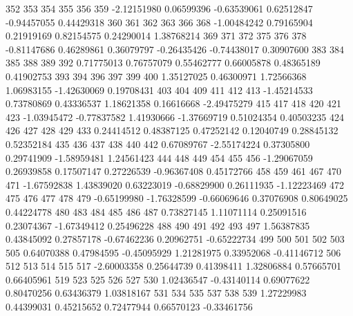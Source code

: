 \documentclass{article}
\begin{document}
\begin{Schunk}
\begin{Soutput}
        352         353         354         355         356         359 
-2.12151980  0.06599396 -0.63539061  0.62512847 -0.94457055  0.44429318 
        360         361         362         363         366         368 
-1.00484242  0.79165904  0.21919169  0.82154575  0.24290014  1.38768214 
        369         371         372         375         376         378 
-0.81147686  0.46289861  0.36079797 -0.26435426 -0.74438017  0.30907600 
        383         384         385         388         389         392 
 0.71775013  0.76757079  0.55462777  0.66005878  0.48365189  0.41902753 
        393         394         396         397         399         400 
 1.35127025  0.46300971  1.72566368  1.06983155 -1.42630069  0.19708431 
        403         404         409         411         412         413 
-1.45214533  0.73780869  0.43336537  1.18621358  0.16616668 -2.49475279 
        415         417         418         420         421         423 
-1.03945472 -0.77837582  1.41930666 -1.37669719  0.51024354  0.40503235 
        424         426         427         428         429         433 
 0.24414512  0.48387125  0.47252142  0.12040749  0.28845132  0.52352184 
        435         436         437         438         440         442 
 0.67089767 -2.55174224  0.37305800  0.29741909 -1.58959481  1.24561423 
        444         448         449         454         455         456 
-1.29067059  0.26939858  0.17507147  0.27226539 -0.96367408  0.45172766 
        458         459         461         467         470         471 
-1.67592838  1.43839020  0.63223019 -0.68829900  0.26111935 -1.12223469 
        472         475         476         477         478         479 
-0.65199980 -1.76328599 -0.66069646  0.37076908  0.80649025  0.44224778 
        480         483         484         485         486         487 
 0.73827145  1.11071114  0.25091516  0.23074367 -1.67349412  0.25496228 
        488         490         491         492         493         497 
 1.56387835  0.43845092  0.27857178 -0.67462236  0.20962751 -0.65222734 
        499         500         501         502         503         505 
 0.64070388  0.47984595 -0.45095929  1.21281975  0.33952068 -0.41146712 
        506         512         513         514         515         517 
-2.60003358  0.25644739  0.41398411  1.32806884  0.57665701  0.66405961 
        519         523         525         526         527         530 
 1.02436547 -0.43140114  0.69077622  0.80470256  0.63436379  1.03818167 
        531         534         535         537         538         539 
 1.27229983  0.44399031  0.45215652  0.72477944  0.66570123 -0.33461756 

\end{Soutput}
\end{Schunk}
\end{document}
